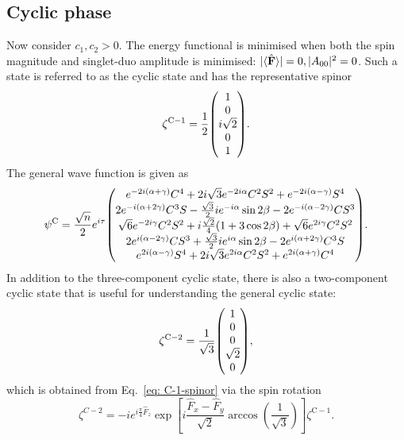 \subsection{Cyclic phase}
Now consider \(c_1, c_2 > 0\).
The energy functional is minimised when both the spin magnitude and singlet-duo
amplitude is minimised: \(|\langle \hat{\vb{F}} \rangle | = 0, |A_{00}|^2=0\).
Such a state is referred to as the cyclic state and has the representative
spinor
\begin{equation}
    \zeta^\mathrm{C-1} = \frac{1}{2}\mqty(1 \\ 0 \\ i\sqrt{2} \\ 0 \\ 1).
    \label{eq: C-1-spinor}
\end{equation}
The general wave function is given as
\begin{equation}\label{eq: general-cyclic-wfn}
    \psi^\mathrm{C} = \frac{\sqrt{n}}{2}e^{i\tau} \mqty(
    e^{-2i(\alpha+\gamma)}C^4 + 2i\sqrt{3}e^{-2i\alpha}C^2S^2
    + e^{-2i(\alpha-\gamma)}S^4
    \\
    2e^{-i(\alpha+2\gamma)}C^3S - \frac{\sqrt{3}}{2}ie^{-i\alpha}\sin 2\beta
    - 2e^{-i(\alpha-2\gamma)}CS^3
    \\
    \sqrt{6}e^{-2i\gamma}C^2S^2 + i\frac{\sqrt{2}}{4}(1+3\cos 2\beta)
    + \sqrt{6}e^{2i\gamma}C^2S^2
    \\
    2e^{i(\alpha-2\gamma)}CS^3 + \frac{\sqrt{3}}{2}ie^{i\alpha}\sin 2\beta
    - 2e^{i(\alpha+2\gamma)}C^3S
    \\
    e^{2i(\alpha-\gamma)}S^4 + 2i\sqrt{3}e^{2i\alpha}C^2S^2
    + e^{2i(\alpha+\gamma)}C^4
    ).
\end{equation}
In addition to the three-component cyclic state, there is also a two-component
cyclic state that is useful for understanding the general cyclic state:
\begin{equation}
    \zeta^\mathrm{C-2} = \frac{1}{\sqrt{3}}\mqty(1  \\ 0 \\ 0 \\ \sqrt{2} \\ 0),
    \label{eq: C-2-spinor}
\end{equation}
which is obtained from Eq.~\eqref{eq: C-1-spinor} via the spin
rotation~\cite{Kawaguchi2012}
\begin{equation}
    \zeta^{C-2} = -ie^{i\frac{\pi}{4}\hat{F}_z}
    \exp\left[i\frac{\hat{F}_x-\hat{F}_y}{\sqrt{2}}
        \arccos{\left(\frac{1}{\sqrt{3}}\right)}\right]\zeta^\mathrm{C-1}.
\end{equation}
